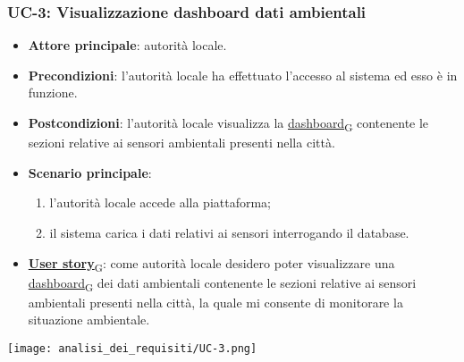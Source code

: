 \subsubsection{UC-3: Visualizzazione dashboard dati ambientali}
\begin{itemize}
	\item \textbf{Attore principale}: autorità locale.
	\item \textbf{Precondizioni}: l'autorità locale ha effettuato l'accesso al sistema ed esso è in funzione.
	\item \textbf{Postcondizioni}: l'autorità locale visualizza la \href{https://7last.github.io/docs/pb/documentazione-interna/glossario\#dashboard}{dashboard\textsubscript{G}} contenente le sezioni relative ai sensori ambientali presenti nella città.
	\item \textbf{Scenario principale}:
	      \begin{enumerate}
		      \item l'autorità locale accede alla piattaforma;
		      \item il sistema carica i dati relativi ai sensori interrogando il database.
	      \end{enumerate}
	\item \href{https://7last.github.io/docs/pb/documentazione-interna/glossario\#user-story}{\textbf{User story}\textsubscript{G}}: come autorità locale desidero poter visualizzare una \href{https://7last.github.io/docs/pb/documentazione-interna/glossario\#dashboard}{dashboard\textsubscript{G}} dei dati ambientali contenente le sezioni relative ai sensori ambientali presenti nella città, la quale mi consente di monitorare la situazione ambientale.
\end{itemize}
\begin{center}
	\texttt{[image: analisi\_dei\_requisiti/UC-3.png]}
\end{center}


